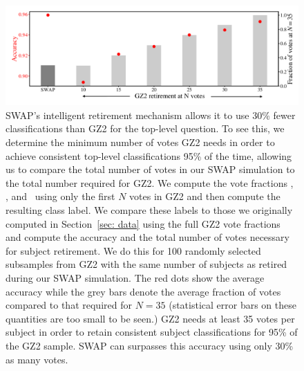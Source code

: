 \begin{figure}
\includegraphics[width=\linewidth]{Figures/human_machine/f15.pdf}
\caption[SWAP's intelligent retirement mechanism 3.5 times fewer classifications than GZ2.]{SWAP's intelligent retirement mechanism allows it to use 30\% fewer classifications than GZ2 for the top-level question. To see this, we determine the minimum number of votes GZ2 needs in order to achieve consistent top-level classifications 95\% of the time, allowing us to compare the total number of votes in our SWAP simulation to the total number required for GZ2. We compute the vote fractions \fsmooth, \ffeat, and \fstar~using only the first $N$ votes in GZ2 and then compute the resulting class label.  We compare these labels to those we originally computed in Section~\ref{sec: data} using the full GZ2 vote fractions and compute the accuracy and the total number of votes necessary for subject retirement. We do this for 100 randomly selected subsamples from GZ2 with the same number of subjects as retired during our SWAP simulation. The red dots show the average accuracy while the grey bars denote the average fraction of votes compared to that required for $N=35$ (statistical error bars on these quantities are too small to be seen.) GZ2 needs at least 35 votes per subject in order to retain consistent subject classifications for 95\% of the GZ2 sample. SWAP can surpasses this accuracy using only 30\% as many votes.}
\label{fig: gz2 min retirement}
\end{figure}

